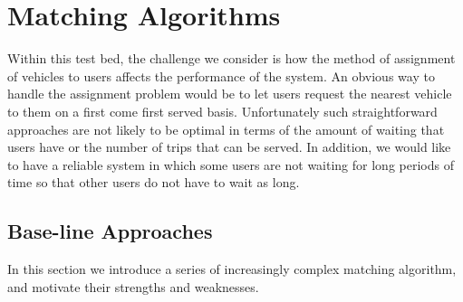 \documentclass[letterpaper]{article}
\begin{document}
\section{Matching Algorithms}

Within this test bed, the challenge we consider is how the method of assignment of vehicles to users affects the performance of the system.  An obvious way to handle the assignment problem would be to let users request the nearest vehicle to them on a first come first served basis. Unfortunately such straightforward approaches are not likely to be optimal in terms of the amount of waiting that users have or the number of trips that can be served. In addition, we would like to have a reliable system in which some users are not waiting for long periods of time so that other users do not have to wait as long. 

\subsection{Base-line Approaches}

In this section we introduce a series of increasingly complex matching algorithm, and motivate their strengths and weaknesses.
\end{document}
